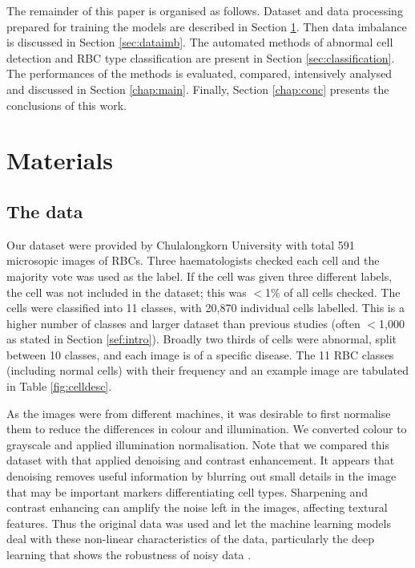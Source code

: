 \documentclass[final,5p,times,twocolumn,authoryear]{elsarticle}
\begin{document}
The remainder of this paper is organised as follows. Dataset and data processing prepared for training the models are described in Section \ref{chap:materialsMethods}. Then data imbalance is discussed in Section \ref{sec:dataimb}. The automated methods of abnormal cell detection and RBC type classification are present in Section \ref{sec:classification}. The
performances of the methods is evaluated, compared, intensively analysed and discussed in Section \ref{chap:main}. Finally,
Section \ref{chap:conc} presents the conclusions of this work.

\section{Materials}
\label{chap:materialsMethods}

\subsection{The data}
\label{ssec:data}

Our dataset were provided by Chulalongkorn University \citep{Korranat:red:2021} with total 591 microsopic images of RBCs.  Three haematologists checked each cell and the majority vote was used as the label. If the cell was given three different labels, the cell was not included in the dataset; this was $<$1\% of all cells checked. The cells were classified into 11 classes, with 20,870 individual cells labelled. This is a higher number of classes and larger dataset than previous studies (often $<$1,000 as stated in Section \ref{sef:intro}). Broadly two thirds of cells were abnormal, split between 10 classes, and each image is of a specific disease. The 11 RBC classes (including normal cells)  with their frequency and an example image are tabulated in Table \ref{fig:celldesc}.

As the images were from different machines, it was desirable to first normalise them to reduce the differences in colour and illumination. We converted colour to grayscale and applied illumination normalisation. Note that we compared this dataset with that applied denoising and contrast enhancement. It appears that denoising removes useful information by blurring out small details in the image that may be important markers differentiating cell types. Sharpening and contrast enhancing can amplify the noise left in the images, affecting textural features. Thus the original data was used and let the machine learning models deal with these non-linear characteristics of the data, particularly the deep learning that shows the robustness of noisy data \citep{Anantrasirichai:Application:2018}.
\end{document}
